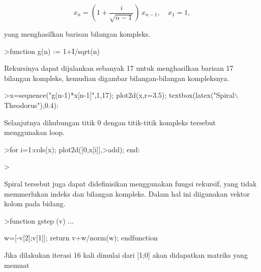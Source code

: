 \documentclass[12pt,arial,letterpaper]{book}
\begin{document}
\begin{eulercomment}
\begin{eulercomment}
\begin{eulercomment}
\begin{eulercomment}
\begin{eulercomment}
\begin{eulercomment}
\begin{eulercomment}
\begin{eulercomment}
\begin{eulercomment}
\begin{eulercomment}
\begin{eulercomment}
\begin{eulercomment}
\begin{eulercomment}
\begin{eulercomment}
\begin{eulercomment}
\begin{eulercomment}
\begin{eulercomment}
\begin{eulercomment}
\begin{eulercomment}
\begin{eulercomment}
\begin{eulercomment}
\begin{eulercomment}
\begin{eulercomment}
\end{eulercomment}
\begin{eulerformula}
\[
x_n = \left( 1 + \frac{i}{\sqrt{n-1}} \right) \, x_{n-1}, \quad x_1=1,
\]
\end{eulerformula}
\begin{eulercomment}
yang menghasilkan barisan bilangan kompleks.
\end{eulercomment}
\begin{eulerprompt}
>function g(n) := 1+I/sqrt(n)
\end{eulerprompt}
\begin{eulercomment}
Rekursinya dapat dijalankan sebanyak 17 untuk menghasilkan barisan 17 bilangan kompleks,
kemudian digambar bilangan-bilangan kompleksnya.
\end{eulercomment}
\begin{eulerprompt}
>x=sequence("g(n-1)*x[n-1]",1,17); plot2d(x,r=3.5); textbox(latex("Spiral\(\backslash\) Theodorus"),0.4):
\end{eulerprompt}
\begin{eulercomment}
Selanjutnya dihubungan titik 0 dengan titik-titik kompleks tersebut menggunakan loop.
\end{eulercomment}
\begin{eulerprompt}
>for i=1:cols(x); plot2d([0,x[i]],>add); end:
\end{eulerprompt}
\begin{eulerprompt}
> 
\end{eulerprompt}
\begin{eulercomment}
Spiral tersebut juga dapat didefinisikan menggunakan fungsi rekursif, yang tidak memmerlukan
indeks dan bilangan kompleks. Dalam hal ini diigunakan vektor kolom pada bidang.
\end{eulercomment}
\begin{eulerprompt}
>function gstep (v) ...
\end{eulerprompt}
\begin{eulerudf}
  w=[-v[2];v[1]];
  return v+w/norm(w);
  endfunction
\end{eulerudf}
\begin{eulercomment}
Jika dilakukan iterasi 16 kali dimulai dari [1;0] akan didapatkan matriks yang memuat

\end{eulercomment}
\end{eulercomment}
\end{eulercomment}
\end{eulercomment}
\end{eulercomment}
\end{eulercomment}
\end{eulercomment}
\end{eulercomment}
\end{eulercomment}
\end{eulercomment}
\end{eulercomment}
\end{eulercomment}
\end{eulercomment}
\end{eulercomment}
\end{eulercomment}
\end{eulercomment}
\end{eulercomment}
\end{eulercomment}
\end{eulercomment}
\end{eulercomment}
\end{eulercomment}
\end{eulercomment}
\end{eulercomment}
\end{document}
